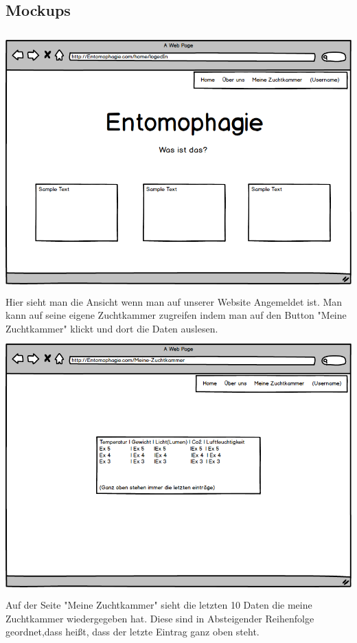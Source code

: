 \subsection{Mockups}
\includegraphics[height=10cm]{figures/Logedin}
Hier sieht man die Ansicht wenn man auf unserer Website Angemeldet ist. Man kann auf seine eigene Zuchtkammer zugreifen indem man auf den Button "Meine Zuchtkammer" klickt und dort die Daten auslesen.
\newpage
\includegraphics[height=10cm]{figures/Meine-Zuchtkammer}
Auf der Seite "Meine Zuchtkammer" sieht die letzten 10 Daten die meine Zuchtkammer wiedergegeben hat. Diese sind in Absteigender Reihenfolge geordnet,dass heißt, dass der letzte Eintrag ganz oben steht.
\newpage
